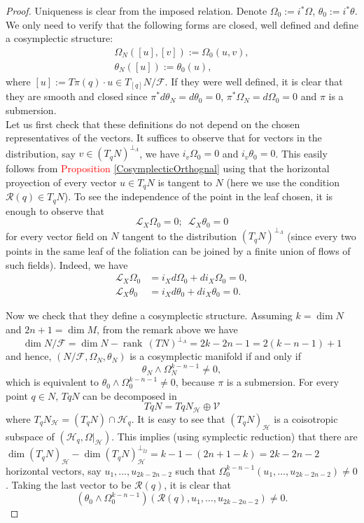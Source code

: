 \documentclass[12pt]{article}
\renewcommand{\dim}{\operatorname{dim}}
\begin{document}
 \begin{proof} Uniqueness is clear from the imposed relation. Denote $\Omega_0:= i^* \Omega$, $\theta_0 := i^*\theta$. We only need to verify that the following forms are closed, well defined and define a cosymplectic structure: \begin{align*} \Omega_N([u],[v]) := \Omega_0(u,v),\\
\theta_N([u]):= \theta_0(u), \end{align*} where $[u]:= T\pi(q) \cdot u \in T_{[q]}N/ \mathcal{F}$. If they were well defined, it is clear that 
they are smooth and closed since $\pi^* d \theta_N = d \theta_0 = 0$, $\pi^*\Omega_N =  d \Omega_0 = 0$ and $\pi$ is a submersion.\\ 

Let us first check that these definitions do not depend on the chosen representatives of the vectors. It suffices to observe that
for vectors in the distribution, say $v \in (T_qN)^{\perp_\Lambda}$, we have $i_v \Omega_0 = 0$ and $i_v \theta_0 = 0$. This easily follows from \textcolor{red}{Proposition \ref{CosymplecticOrthognal}} using that the horizontal proyection of every vector $u \in T_qN$ is tangent to $N$ (here we use the condition $\mathcal{R}(q) \in T_qN$). To see the independence of the point in the leaf chosen, it is enough to observe that $$\mathcal{L}_X \Omega_0 = 0; \,\,\, \mathcal{L}_X \theta_0 = 0 $$ for every vector field on $N$ tangent to the distribution $(T_qN)^{\perp_\Lambda}$ (since every two points in the same leaf of the foliation
can be joined by a finite union of flows of such fields).  Indeed, we have
\begin{align*}
\mathcal{L}_X\Omega_0 &= i_X d\Omega_0 + di_X \Omega_0 = 0,\\
\mathcal{L}_X \theta_0  &= i_X d\theta_0 + di_X\theta_0 = 0.
\end{align*}

Now we check that they define a cosymplectic structure. Assuming $k = \dim N$ and $2n +1 = \dim M$, from the remark above we have $$\dim N/\mathcal{F} = \dim N - \operatorname{rank}\, (TN)^{\perp_\Lambda} = 2k - 2n -1 = 2(k - n -1 ) + 1$$ and hence, $(N/\mathcal{F},\Omega_N,\theta_N)$ is a cosymplectic manifold if and only if $$\theta_N \wedge \Omega_N^{k-n-1}\neq 0,$$ which is equivalent to $\theta_0 \wedge \Omega_0^{k-n-1} \neq 0$, because $\pi$ is a submersion. For every point $q \in N$, $TqN$ can be decomposed in $$TqN =  TqN_\mathcal{H} \oplus \mathcal{V}$$ where $T_qN_\mathcal{H} = (T_qN) \cap \mathcal{H}_q$. It is easy to see that $(T_qN)_\mathcal{H}$ is a coisotropic subspace of $(\mathcal{H}_q, \Omega|_\mathcal{H})$. This implies (using symplectic reduction) that there are $\dim(T_qN)_\mathcal{H} - \dim (T_qN)_\mathcal{H}^{\perp_{\widetilde \Omega}} = k - 1 - (2n +1 -k) = 2k - 2n - 2$ horizontal vectors, say $u_1, \dots, u_{2k-2n-2}$ such that $\Omega_0^{k-n-1}(u_1, \dots, u_{2k-2n-2})\neq 0$. Taking the last vector to be $\mathcal{R}(q)$, it is clear that $$(\theta_0 \wedge \Omega_0^{k-n-1})(\mathcal{R}(q), u_1, \dots, u_{2k-2n-2}) \neq 0.$$ \end{proof}
\end{document}
